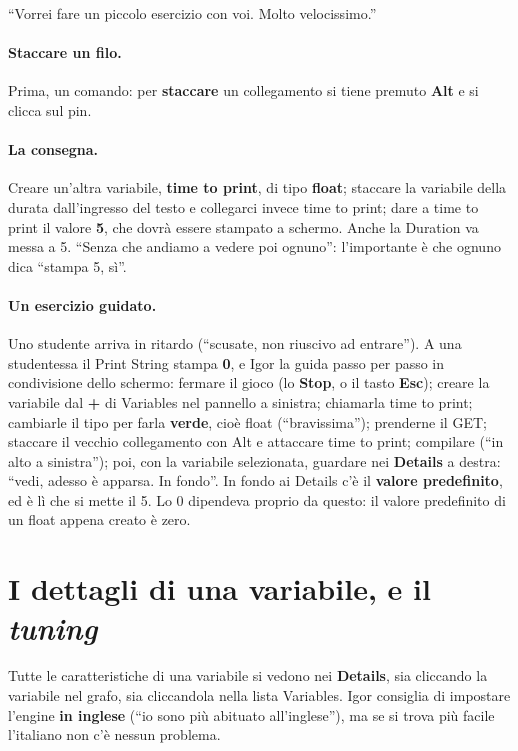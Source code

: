 ``Vorrei fare un piccolo esercizio con voi. Molto velocissimo.''

\paragraph{Staccare un filo.} Prima, un comando: per \textbf{staccare} un collegamento
si tiene premuto \textbf{Alt} e si clicca sul pin.

\paragraph{La consegna.} Creare un'altra variabile, \textbf{time to print}, di tipo
\textbf{float}; staccare la variabile della durata dall'ingresso del testo e collegarci
invece time to print; dare a time to print il valore \textbf{5}, che dovrà essere
stampato a schermo. Anche la Duration va messa a 5. ``Senza che andiamo a vedere poi
ognuno'': l'importante è che ognuno dica ``stampa 5, sì''.

\paragraph{Un esercizio guidato.} Uno studente arriva in ritardo (``scusate, non
riuscivo ad entrare''). A una studentessa il Print String stampa \textbf{0}, e Igor la
guida passo per passo in condivisione dello schermo: fermare il gioco (lo
\textbf{Stop}, o il tasto \textbf{Esc}); creare la variabile dal \textbf{+} di Variables
nel pannello a sinistra; chiamarla time to print; cambiarle il tipo per farla
\textbf{verde}, cioè float (``bravissima''); prenderne il GET; staccare il vecchio
collegamento con Alt e attaccare time to print; compilare (``in alto a sinistra'');
poi, con la variabile selezionata, guardare nei \textbf{Details} a destra: ``vedi, adesso
è apparsa. In fondo''. In fondo ai Details c'è il \textbf{valore predefinito}, ed è lì
che si mette il 5. Lo 0 dipendeva proprio da questo: il valore predefinito di un float
appena creato è zero.

\section{I dettagli di una variabile, e il \emph{tuning}}
\label{ue2:sec:dettagli}

Tutte le caratteristiche di una variabile si vedono nei \textbf{Details}, sia cliccando
la variabile nel grafo, sia cliccandola nella lista Variables. Igor consiglia di
impostare l'engine \textbf{in inglese} (``io sono più abituato all'inglese''), ma se si
trova più facile l'italiano non c'è nessun problema.

